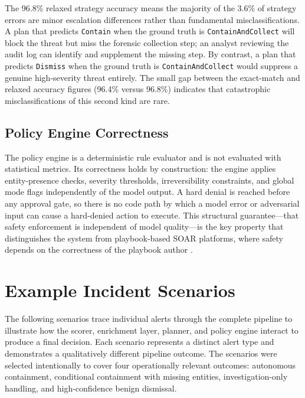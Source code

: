 The 96.8\% relaxed strategy accuracy means the majority of the 3.6\% of strategy errors are minor escalation differences rather than fundamental misclassifications. A plan that predicts \texttt{Contain} when the ground truth is \texttt{ContainAndCollect} will block the threat but miss the forensic collection step; an analyst reviewing the audit log can identify and supplement the missing step. By contrast, a plan that predicts \texttt{Dismiss} when the ground truth is \texttt{ContainAndCollect} would suppress a genuine high-severity threat entirely. The small gap between the exact-match and relaxed accuracy figures (96.4\% versus 96.8\%) indicates that catastrophic misclassifications of this second kind are rare.

\subsection{Policy Engine Correctness}

The policy engine is a deterministic rule evaluator and is not evaluated with statistical metrics. Its correctness holds by construction: the engine applies entity-presence checks, severity thresholds, irreversibility constraints, and global mode flags independently of the model output. A hard denial is reached before any approval gate, so there is no code path by which a model error or adversarial input can cause a hard-denied action to execute. This structural guarantee---that safety enforcement is independent of model quality---is the key property that distinguishes the system from playbook-based SOAR platforms, where safety depends on the correctness of the playbook author \cite{tilbury2024humans}.

\section{Example Incident Scenarios}
\label{sec:eval-scenarios}

The following scenarios trace individual alerts through the complete pipeline to illustrate how the scorer, enrichment layer, planner, and policy engine interact to produce a final decision. Each scenario represents a distinct alert type and demonstrates a qualitatively different pipeline outcome.
The scenarios were selected intentionally to cover four operationally relevant outcomes: autonomous containment, conditional containment with missing entities, investigation-only handling, and high-confidence benign dismissal.

